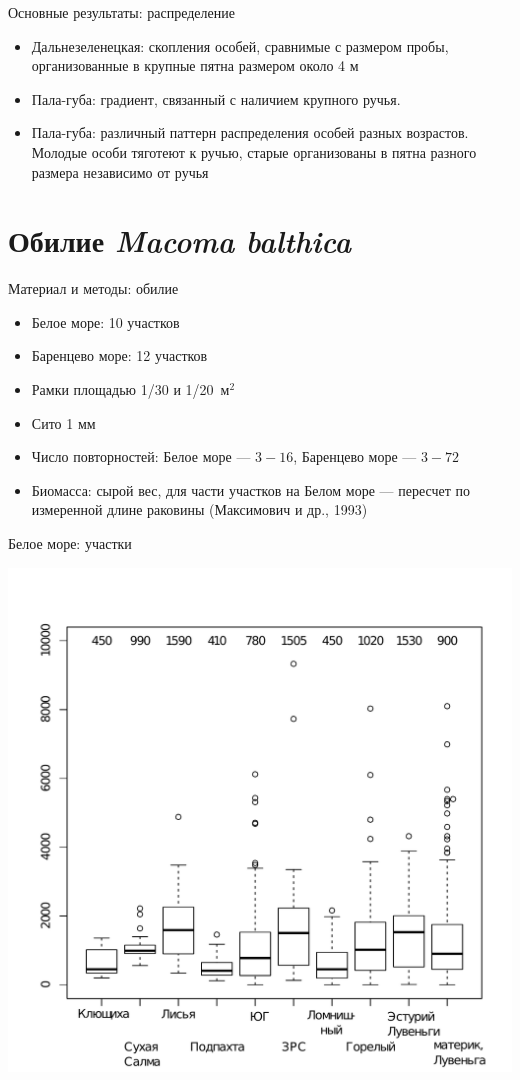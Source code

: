 \documentclass{beamer}
\begin{document}
\begin{frame}{Основные результаты: распределение}
\begin{itemize}
	\item Дальнезеленецкая: скопления особей, сравнимые с размером пробы, организованные в крупные пятна размером около 4 м
	\item Пала-губа: градиент, связанный с наличием крупного ручья. 
	\item Пала-губа: различный паттерн распределения особей разных возрастов. Молодые особи тяготеют к ручью, старые организованы в пятна разного размера независимо от ручья

\end{itemize}
\end{frame}

		\section[Обилие]{Обилие {\it Macoma balthica}}
\begin{frame}{Материал и методы: обилие}
\begin{itemize}
	\item Белое море: 10 участков
	\item Баренцево море: 12 участков	
	\item Рамки площадью 1/30 и 1/20~м$^2$
	\item Сито 1 мм
	\item Число повторностей: Белое море --- $3-16$, Баренцево море --- $3-72$
	\item Биомасса: сырой вес, для части участков на Белом море --- пересчет по измеренной длине раковины (Максимович и др., 1993)

\end{itemize}
\end{frame}

\begin{frame}{Белое море: участки}
 \begin{center}
		\includegraphics[width=.8\textwidth]{N2_area_White1.pdf}
 \end{center}
\end{frame}
\end{document}
